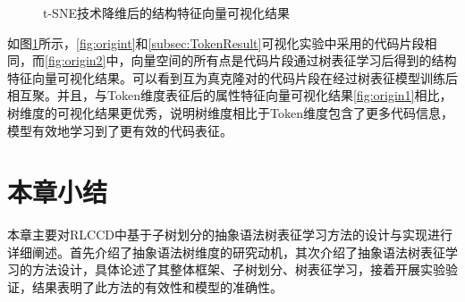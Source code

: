 \begin{figure}[H] 
  \centering  %
  \caption{t-SNE技术降维后的结构特征向量可视化结果}    %
  \label{fig:origintwo}    %
\end{figure}

如图\ref{fig:origintwo}所示，\ref{fig:origint}和\ref{subsec:TokenResult}可视化实验中采用的代码片段相同，而\ref{fig:origin2}中，向量空间的所有点是代码片段通过树表征学习后得到的结构特征向量可视化结果。可以看到互为真克隆对的代码片段在经过树表征模型训练后相互聚。并且，与Token维度表征后的属性特征向量可视化结果\ref{fig:origin1}相比，树维度的可视化结果更优秀，说明树维度相比于Token维度包含了更多代码信息，模型有效地学习到了更有效的代码表征。


\section{本章小结}
\label{sec:Summary4}
本章主要对RLCCD中基于子树划分的抽象语法树表征学习方法的设计与实现进行详细阐述。首先介绍了抽象语法树维度的研究动机，其次介绍了抽象语法树表征学习的方法设计，具体论述了其整体框架、子树划分、树表征学习，接着开展实验验证，结果表明了此方法的有效性和模型的准确性。



